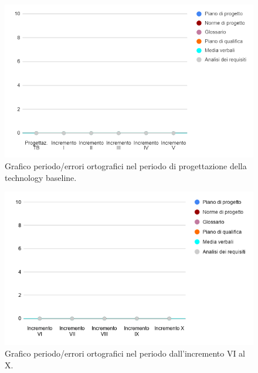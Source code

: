 \begin{figure}[H]
	\centering
	\includegraphics[width=0.8\linewidth]{./res/images/ortografia_2.png}
	\caption{Grafico periodo/errori ortografici nel periodo di progettazione della technology baseline.}
	\label{fig:Grafico errori ortografici durante il periodo di progettazione della technology baseline.}
\end{figure}

\begin{figure}[H]
	\centering
	\includegraphics[width=0.8\linewidth]{./res/images/ortografia_3.png}
	\caption{Grafico periodo/errori ortografici nel periodo dall'incremento VI al X.}
	\label{fig:Grafico errori ortografici durante il periodo dall'incremento VI al X.}
\end{figure}

